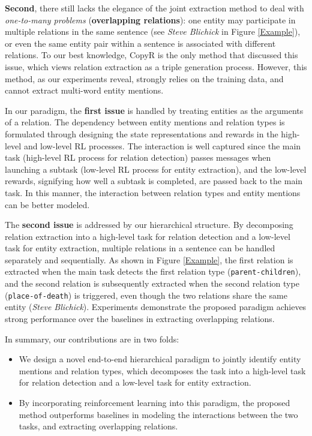 \documentclass[letterpaper]{article} \usepackage{aaai19}  \usepackage{times}  \usepackage{helvet}  \usepackage{courier}  \usepackage{url}  \usepackage{graphicx}  \frenchspacing  \setlength{\pdfpagewidth}{8.5in}  \setlength{\pdfpageheight}{11in}  \usepackage{amsfonts}
\theoremstyle{definition}
\begin{document}
\textbf{Second}, there still lacks the elegance of the joint extraction method to deal with {\it one-to-many problems} (\textbf{overlapping relations}): one entity may participate in multiple relations in the same sentence  (see \textit{Steve Blichick} in Figure \ref{Example}), or even the same entity pair within a sentence is associated with different relations. To our best knowledge, CopyR \cite{zeng2018extracting} is the only method that discussed this issue, which views relation extraction as a triple generation process. However, this method, as our experiments reveal, strongly relies on the training data, and cannot extract multi-word entity mentions. 

In our paradigm, the \textbf{first issue} is handled by treating entities as the arguments of a relation.
The dependency between entity mentions and relation types is formulated through designing the state representations and rewards in the high-level and low-level RL processes.
The interaction is well captured since the main task (high-level RL process for relation detection) passes messages when launching a subtask (low-level RL process for entity extraction), and the low-level rewards, signifying how well a subtask is completed, are passed back to the main task. In this manner, the interaction between relation types and entity mentions can be better modeled.

The \textbf{second issue} is addressed by our hierarchical structure. By decomposing relation extraction into a high-level task for relation detection and a low-level task for entity extraction, multiple relations in a sentence can be handled separately and sequentially. As shown in Figure \ref{Example}, the first relation is extracted when the main task detects the first relation type (\texttt{parent-children}), and the second relation is subsequently extracted when the second relation type (\texttt{place-of-death}) is triggered, even though the two relations share the same entity (\textit{Steve Blichick}). Experiments demonstrate the proposed paradigm achieves strong performance over the baselines in extracting overlapping relations.

In summary, our contributions are in two folds:
\begin{itemize}

\item 
We design a novel end-to-end hierarchical paradigm to jointly identify entity mentions and relation types, which decomposes the task into a high-level task for relation detection and a low-level task for entity extraction. 

\item 
By incorporating reinforcement learning into this paradigm, the proposed method outperforms baselines in modeling the interactions between the two tasks, and extracting overlapping relations.
\end{itemize}
\end{document}
